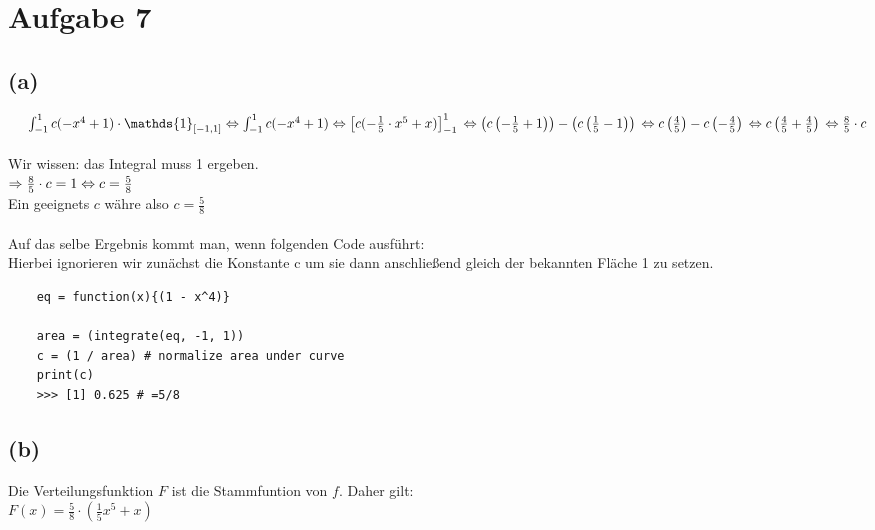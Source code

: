 \documentclass[a4paper]{scrartcl}
\begin{document}
\section*{Aufgabe 7}
\subsection*{(a)}
$
\;\;\;\;\;\int_{-1}^{1} c(-x^4 + 1) \cdot \mathds{1}_{\left[-1,1\right]}\\\\
\Leftrightarrow \int_{-1}^{1} c(-x^4 + 1)\\\\
\Leftrightarrow \left[ c(-\frac{1}{5} \cdot x^5 + x) \right]_{-1}^1\\\\
\Leftrightarrow \left( c \left( -\frac{1}{5} + 1 \right)\right) - \left( c \left( \frac{1}{5} - 1 \right)  \right)\\\\
\Leftrightarrow c \left( \frac{4}{5} \right) - c\left( -\frac{4}{5} \right)\\\\
\Leftrightarrow c \left( \frac{4}{5} + \frac{4}{5} \right)\\\\
\Leftrightarrow \frac{8}{5}  \cdot c
$\\\\
Wir wissen: das Integral muss 1 ergeben.\\
$
\Rightarrow \frac{8}{5} \cdot c = 1\\
\Leftrightarrow c = \frac{5}{8} 
$\\
Ein geeignets $c$ währe also $c=\frac{5}{8}$\\
\\
Auf das selbe Ergebnis kommt man, wenn folgenden Code ausführt:\\
Hierbei ignorieren wir zunächst die Konstante c um sie dann anschließend gleich der bekannten Fläche 1 zu setzen.
\begin{lstlisting}
	eq = function(x){(1 - x^4)}
	
	area = (integrate(eq, -1, 1))
	c = (1 / area) # normalize area under curve
	print(c)
	>>> [1] 0.625 # =5/8
\end{lstlisting}


\subsection*{(b)}
Die Verteilungsfunktion $F$ ist die Stammfuntion von $f$. Daher gilt:\\
$F(x) = \frac{5}{8} \cdot (\frac{1}{5}x^5 + x)$
\end{document}
